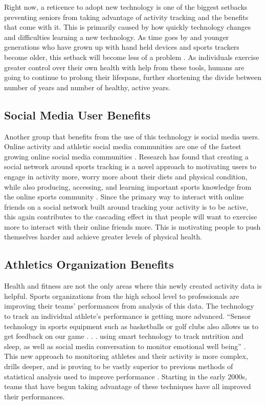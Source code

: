 \documentclass[sigconf]{acmart}
\begin{document}
Right now, a reticence to adopt new technology is one of the biggest setbacks preventing seniors from taking advantage of activity tracking and the benefits that come with it. This is primarily caused by how quickly technology changes and difficulties learning a new technology. As time goes by and younger generations who have grown up with hand held devices and sports trackers become older, this setback will become less of a problem \cite{valenzuela2016}. As individuals exercise greater control over their own health with help from these tools, humans are going to continue to prolong their lifespans, further shortening the divide between number of years and number of healthy, active years.

\subsection{Social Media User Benefits}

Another group that benefits from the use of this technology is social media users. Online activity and athletic social media communities are one of the fastest growing online social media communities \cite{ojala2010}. Research has found that creating a social network around sports tracking is a novel approach to motivating users to engage in activity more, worry more about their diets and physical condition, while also producing, accessing, and learning important sports knowledge from the online sports community \cite{ojala2010}. Since the primary way to interact with online friends on a social network built around tracking your activity is to be active, this again contributes to the cascading effect in that people will want to exercise more to interact with their online friends more. This is motivating people to push themselves harder and achieve greater levels of physical health.

\subsection{Athletics Organization Benefits}

Health and fitness are not the only areas where this newly created activity data is helpful. Sports organizations from the high school level to professionals are improving their teams' performances from analysis of this data. The technology to track an individual athlete's performance is getting more advanced. ``Sensor technology in sports equipment such as basketballs or golf clubs also allows us to get feedback on our game . . . using smart technology to track nutrition and sleep, as well as social media conversation to monitor emotional well being'' \cite{marr2015}. This new approach to monitoring athletes and their activity is more complex, drills deeper, and is proving to be vastly superior to previous methods of statistical analysis used to improve performance \cite{marr2015}. Starting in the early 2000s, teams that have begun taking advantage of these techniques have all improved their performances. 
\end{document}
